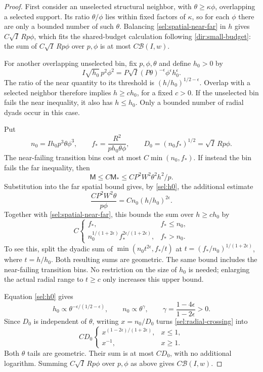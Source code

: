 \begin{proof}
First consider an unselected structural neighbor, with
$\theta\ge\kappa\phi$, overlapping a selected support. Its ratio
$\theta/\phi$ lies within fixed factors of $\kappa$, so for each $\phi$
there are only a bounded number of such $\theta$. Balancing
\eqref{sel:spatial-near-far} in $h$ gives $C\sqrt I\,Rp\phi$, which fits
the shared-budget calculation following \eqref{dir:small-budget}:
the sum of $C\sqrt I\,Rp\phi$ over $p,\phi$ is at most
$C\mathcal B(I,w)$.

For another overlapping unselected bin, fix $p,\phi,\theta$ and define
$h_0>0$ by
\begin{equation}\label{sel:h0}
 I\sqrt{h_0}\,p^2\phi^2
 =P\sqrt I(P\theta)^{-\epsilon}\phi^\epsilon h_0^\epsilon.
\end{equation}
The ratio of the near quantity to its threshold is
$(h/h_0)^{1/2-\epsilon}$. Overlap with a selected neighbor therefore
implies $h\ge c h_0$, for a fixed $c>0$. If the unselected bin fails the
near inequality, it also has $h\le h_0$. Only a bounded number of radial
dyads occur in this case.

Put
\begin{equation}\label{sel:n-f}
 n_0=Ih_0p^3\theta\phi^3,
 \qquad f_*=\frac{R^2}{ph_0\theta\phi},
 \qquad D_0=(n_0f_*)^{1/2}=\sqrt I\,Rp\phi.
\end{equation}
The near-failing transition bins cost at most $C\min(n_0,f_*)$.
If instead the bin fails the far inequality, then
\[
 \mathsf M\le C\mathsf M_*
 \le CP^2W^2\theta^2h^2/p.
\]
Substitution into the far spatial bound gives, by \eqref{sel:h0}, the
additional estimate
\[
 \frac{CP^2W^2\theta}{p\phi}
 =Cn_0(h/h_0)^{2\epsilon}.
\]
Together with \eqref{sel:spatial-near-far}, this bounds the sum over
$h\ge ch_0$ by
\begin{equation}\label{sel:radial-crossing}
 C\begin{cases}
 f_*,&f_*\le n_0,\\
 n_0^{1/(1+2\epsilon)}f_*^{2\epsilon/(1+2\epsilon)},&f_*>n_0.
 \end{cases}
\end{equation}
To see this, split the dyadic sum of
$\min(n_0t^{2\epsilon},f_*/t)$ at
$t=(f_*/n_0)^{1/(1+2\epsilon)}$, where $t=h/h_0$. Both resulting sums
are geometric. The same bound includes the near-failing transition bins.
No restriction on the size of $h_0$ is needed; enlarging the actual
radial range to $t\ge c$ only increases this upper bound.

Equation \eqref{sel:h0} gives
\[
 h_0\propto\theta^{-\epsilon/(1/2-\epsilon)},
 \qquad n_0\propto\theta^\gamma,
 \qquad \gamma=\frac{1-4\epsilon}{1-2\epsilon}>0.
\]
Since $D_0$ is independent of $\theta$, writing $x=n_0/D_0$ turns
\eqref{sel:radial-crossing} into
\[
 CD_0\begin{cases}
 x^{(1-2\epsilon)/(1+2\epsilon)},&x\le1,\\
 x^{-1},&x\ge1.
 \end{cases}
\]
Both $\theta$ tails are geometric. Their sum is at most $CD_0$, with no
additional logarithm. Summing $C\sqrt I\,Rp\phi$ over $p,\phi$
as above gives $C\mathcal B(I,w)$.


\end{proof}
